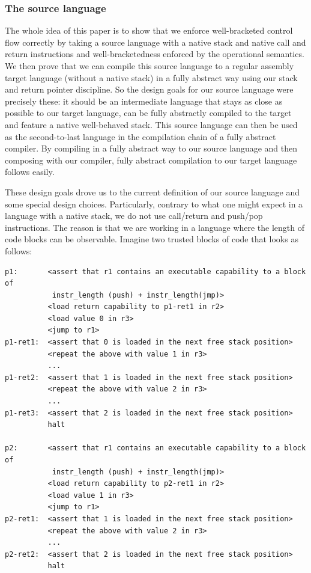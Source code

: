 \documentclass[a4paper]{article}
\begin{document}
\subsubsection{The source language}
The whole idea of this paper is to show that we enforce well-bracketed control flow correctly by taking a source language with a native stack and native call and return instructions and well-bracketedness enforced by the operational semantics.
We then prove that we can compile this source language to a regular assembly target language (without a native stack) in a fully abstract way using our stack and return pointer discipline.
So the design goals for our source language were precisely these: it should be an intermediate language that stays as close as possible to our target language, can be fully abstractly compiled to the target and feature a native well-behaved stack.
This source language can then be used as the second-to-last language in the compilation chain of a fully abstract compiler.
By compiling in a fully abstract way to our source language and then composing with our compiler, fully abstract compilation to our target language follows easily.

These design goals drove us to the current definition of our source language and some special design choices.
Particularly, contrary to what one might expect in a language with a native stack, we do not use call/return and push/pop instructions.
The reason is that we are working in a language where the length of code blocks can be observable.
Imagine two trusted blocks of code that looks as follows:
\begin{lstlisting}[basicstyle=\sourcecolor{}\ttfamily] 
p1:       <assert that r1 contains an executable capability to a block of 
           instr_length (push) + instr_length(jmp)> 
          <load return capability to p1-ret1 in r2>
          <load value 0 in r3>
          <jump to r1>
p1-ret1:  <assert that 0 is loaded in the next free stack position>
          <repeat the above with value 1 in r3>
          ...
p1-ret2:  <assert that 1 is loaded in the next free stack position>
          <repeat the above with value 2 in r3>
          ...
p1-ret3:  <assert that 2 is loaded in the next free stack position>
          halt

p2:       <assert that r1 contains an executable capability to a block of 
           instr_length (push) + instr_length(jmp)>
          <load return capability to p2-ret1 in r2>
          <load value 1 in r3>
          <jump to r1>
p2-ret1:  <assert that 1 is loaded in the next free stack position>
          <repeat the above with value 2 in r3>
          ...
p2-ret2:  <assert that 2 is loaded in the next free stack position>
          halt
\end{lstlisting}
\end{document}
